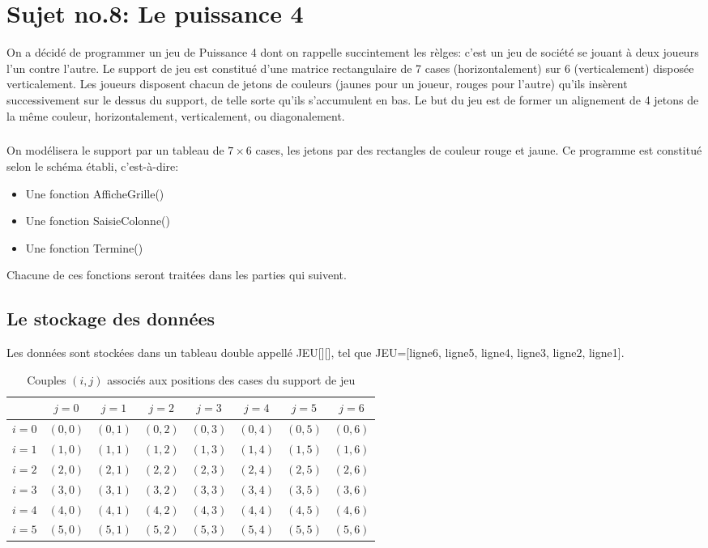 \documentclass[a4paper]{report}
\begin{document}
\chapter*{Sujet no.8: Le puissance 4}
On a décidé de programmer un jeu de Puissance 4 dont on rappelle succintement les rèlges:
c'est un jeu de société se jouant à deux joueurs l'un contre l'autre. Le support de jeu est constitué d'une matrice rectangulaire de 7 cases (horizontalement) sur 6 (verticalement) disposée verticalement. Les joueurs disposent chacun de jetons de couleurs (jaunes pour un joueur, rouges pour l'autre) qu'ils insèrent successivement sur le dessus du support, de telle sorte qu'ils s'accumulent en bas. Le but du jeu est de former un alignement de 4 jetons de la même couleur, horizontalement, verticalement, ou diagonalement.
\paragraph{}On modélisera le support par un tableau de $7\times 6$ cases, les jetons par des rectangles de couleur rouge et jaune. Ce programme est constitué selon le schéma établi, c'est-à-dire:
\begin{itemize}
\item Une fonction AfficheGrille()
\item Une fonction SaisieColonne()
\item Une fonction Termine()
\end{itemize}

Chacune de ces fonctions seront traitées dans les parties qui suivent.
\section*{Le stockage des données}
Les données sont stockées dans un tableau double appellé JEU[][], tel que JEU=[ligne6, ligne5, ligne4, ligne3, ligne2, ligne1].

\begin{table}[h!]
\centering
\begin{tabular}{l||c|c|c|c|c|c|c} 

 & $j=0$ & $j=1$& $j=2$& $j=3$& $j=4$& $j=5$& $j=6$\\ 
\midrule
\midrule 
$i=0$ & $(0,0)$ & $(0,1)$& $(0,2)$& $(0,3)$& $(0,4)$& $(0,5)$& $(0,6)$\\ 
\hline
$i=1$ & $(1,0)$ & $(1,1)$& $(1,2)$& $(1,3)$& $(1,4)$& $(1,5)$&$(1,6)$\\ 
\hline
$i=2$ & $(2,0)$ & $(2,1)$& $(2,2)$& $(2,3)$& $(2,4)$& $(2,5)$& $(2,6)$\\ 
\hline
$i=3$ & $(3,0)$ & $(3,1)$& $(3,2)$& $(3,3)$& $(3,4)$& $(3,5)$& $(3,6)$\\ 
\hline
$i=4$ & $(4,0)$ & $(4,1)$& $(4,2)$& $(4,3)$& $(4,4)$& $(4,5)$& $(4,6)$\\ 
\hline
$i=5$ & $(5,0)$ & $(5,1)$& $(5,2)$& $(5,3)$& $(5,4)$& $(5,5)$& $(5,6)$\\ 
\bottomrule
\end{tabular}
\caption{Couples $(i,j)$ associés aux positions des cases du support de jeu} 
\label{tab:tubesLong}
\end{table}
\end{document}
